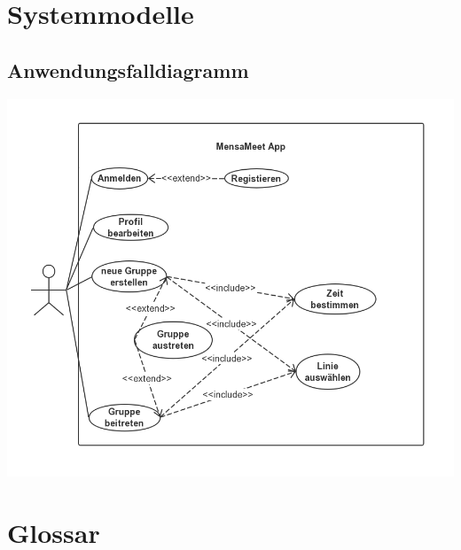 \documentclass[a4paper]{scrreprt}
\begin{document}
\chapter{Systemmodelle}
\section{Anwendungsfalldiagramm}	

\includegraphics[scale=0.6]{userCase.jpg}


\chapter{Glossar}
 

 
\end{document}
